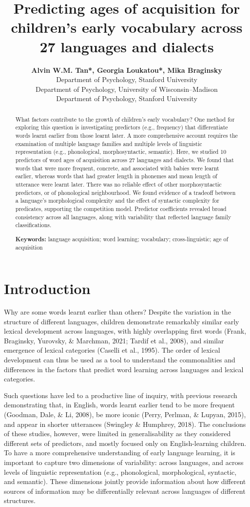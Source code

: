 \documentclass[10pt, letterpaper]{article}
\title{Predicting ages of acquisition for children's early vocabulary
across 27 languages and dialects}
\author{{\large \bf Alvin W.M. Tan*, Georgia Loukatou*, Mika Braginsky} \\ Department of Psychology, Stanford University \AND {\large \bf Jess Mankewitz} \\ Department of Psychology, University of Wisconsin--Madison \AND {\large \bf Michael C. Frank} \\ Department of Psychology, Stanford University}
\begin{document}
\maketitle

\begin{abstract}
What factors contribute to the growth of children's early vocabulary?
One method for exploring this question is investigating predictors
(e.g., frequency) that differentiate words learnt earlier from those
learnt later. A more comprehensive account requires the examination of
multiple language families and multiple levels of linguistic
representation (e.g., phonological, morphosyntactic, semantic). Here, we
studied 10 predictors of word ages of acquisition across 27 languages
and dialects. We found that words that were more frequent, concrete, and
associated with babies were learnt earlier, whereas words that had
greater length in phonemes and mean length of utterance were learnt
later. There was no reliable effect of other morphosyntactic predictors,
or of phonological neighbourhood. We found evidence of a tradeoff
between a language's morphological complexity and the effect of
syntactic complexity for predicates, supporting the competition model.
Predictor coefficients revealed broad consistency across all languages,
along with variability that reflected language family classifications.

\textbf{Keywords:}
language acquisition; word learning; vocabulary; cross-linguistic; age
of acquisition
\end{abstract}

\section{Introduction}\label{introduction}

Why are some words learnt earlier than others? Despite the variation in
the structure of different languages, children demonstrate remarkably
similar early lexical development across languages, with highly
overlapping first words (Frank, Braginsky, Yurovsky, \& Marchman, 2021;
Tardif et al., 2008), and similar emergence of lexical categories
(Caselli et al., 1995). The order of lexical development can thus be
used as a tool to understand the commonalities and differences in the
factors that predict word learning across languages and lexical
categories.

Such questions have led to a productive line of inquiry, with previous
research demonstrating that, in English, words learnt earlier tend to be
more frequent (Goodman, Dale, \& Li, 2008), be more iconic (Perry,
Perlman, \& Lupyan, 2015), and appear in shorter utterances (Swingley \&
Humphrey, 2018). The conclusions of these studies, however, were limited
in generalisability as they considered different sets of predictors, and
mostly focused only on English-learning children. To have a more
comprehensive understanding of early language learning, it is important
to capture two dimensions of variability: across languages, and across
levels of linguistic representation (e.g., phonological, morphological,
syntactic, and semantic). These dimensions jointly provide information
about how different sources of information may be differentially
relevant across languages of different structures.
\end{document}
